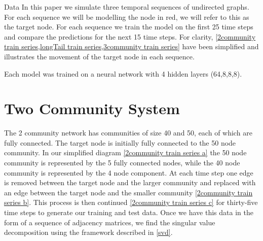 \documentclass[12pt]{amsbook}
\begin{document}
\begin{chapter}{Data}
    In this paper we simulate three temporal sequences of undirected graphs. For each sequence we will be modelling the node in red, we will refer to this as the target node. For each sequence we train the model on the first 25 time steps and compare the predictions for the next 15 time steps. For clarity, \cref{2community train series,longTail train series,3community train series} have been simplified and illustrates the movement of the target node in each sequence.

    Each model was trained on a neural network with 4 hidden layers (64,8,8,8).

    \section{Two Community System}
        The 2 community network has communities of size 40 and 50, each of which are fully connected. The target node is initially fully connected to the 50 node community. In our simplified diagram \cref{2community train series a} the 50 node community is represented by the 5 fully connected nodes, while the 40 node community is represented by the 4 node component. At each time step one edge is removed between the target node and the larger community and replaced with an edge between the target node and the smaller community \cref{2community train series b}. This process is then continued \cref{2community train series c} for thirty-five time steps to generate our training and test data. Once we have this data in the form of a sequence of adjacency matrices, we find the singular value decomposition using the framework described in \cref{svd}.


\end{chapter}
\end{document}
